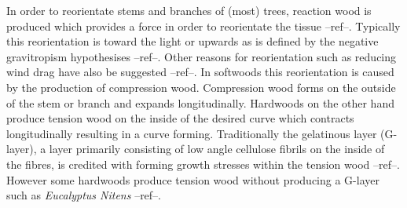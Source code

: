 In order to reorientate stems and branches of (most) trees, reaction wood is
produced which provides a force in order to reorientate the tissue --ref--.
Typically this reorientation is toward the light or upwards as is defined by the
negative gravitropism hypothesises --ref--. Other reasons for reorientation such
as reducing wind drag have also be suggested --ref--. In softwoods this
reorientation is caused by the production of compression wood. Compression wood
forms on the outside of the stem or branch and expands longitudinally. Hardwoods
on the other hand produce tension wood on the inside of the desired curve which
contracts longitudinally resulting in a curve forming. Traditionally the
gelatinous layer (G-layer), a layer primarily consisting of low angle cellulose
fibrils on the inside of the fibres, is credited with forming growth stresses
within the tension wood --ref--. However some hardwoods produce tension wood
without producing a G-layer such as \textit{Eucalyptus Nitens} --ref--.
